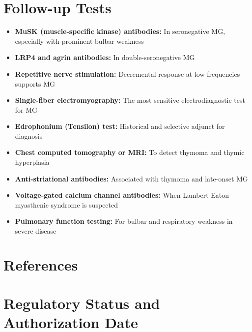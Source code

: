 \section*{Follow-up Tests}
\begin{itemize}
  \item \textbf{MuSK (muscle-specific kinase) antibodies:} In seronegative MG, especially with prominent bulbar weakness
  \item \textbf{LRP4 and agrin antibodies:} In double-seronegative MG
  \item \textbf{Repetitive nerve stimulation:} Decremental response at low frequencies supports MG
  \item \textbf{Single-fiber electromyography:} The most sensitive electrodiagnostic test for MG
  \item \textbf{Edrophonium (Tensilon) test:} Historical and selective adjunct for diagnosis
  \item \textbf{Chest computed tomography or MRI:} To detect thymoma and thymic hyperplasia
  \item \textbf{Anti-striational antibodies:} Associated with thymoma and late-onset MG
  \item \textbf{Voltage-gated calcium channel antibodies:} When Lambert-Eaton myasthenic syndrome is suspected
  \item \textbf{Pulmonary function testing:} For bulbar and respiratory weakness in severe disease
\end{itemize}

\section*{References}



\clearpage
\section*{Regulatory Status and Authorization Date}

\clearpage
